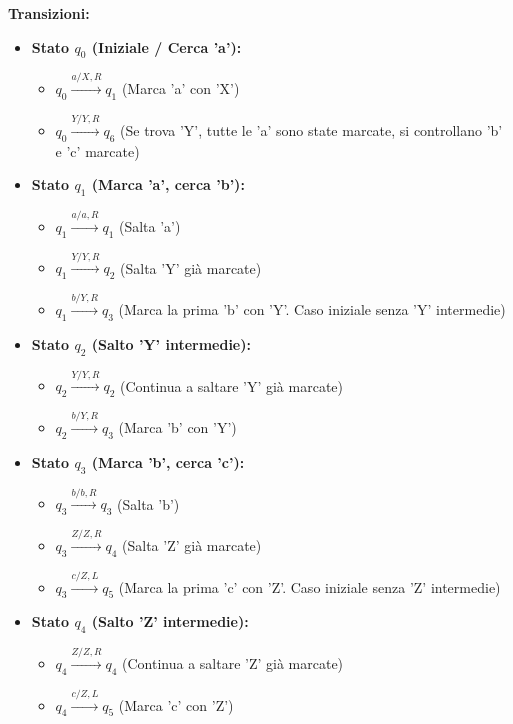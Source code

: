 \documentclass[a4paper]{article}
\begin{document}
\noindent \textbf{Transizioni:}
\begin{itemize}
    \item \textbf{Stato $q_0$ (Iniziale / Cerca 'a'):}
        \begin{itemize}
            \item $q_0 \xrightarrow{a / X, R} q_1$ (Marca 'a' con 'X')
            \item $q_0 \xrightarrow{Y / Y, R} q_6$ (Se trova 'Y', tutte le 'a' sono state marcate, si controllano 'b' e 'c' marcate)
        \end{itemize}
    \item \textbf{Stato $q_1$ (Marca 'a', cerca 'b'):}
        \begin{itemize}
            \item $q_1 \xrightarrow{a / a, R} q_1$ (Salta 'a')
            \item $q_1 \xrightarrow{Y / Y, R} q_2$ (Salta 'Y' già marcate)
            \item $q_1 \xrightarrow{b / Y, R} q_3$ (Marca la prima 'b' con 'Y'. Caso iniziale senza 'Y' intermedie)
        \end{itemize}
    \item \textbf{Stato $q_2$ (Salto 'Y' intermedie):}
        \begin{itemize}
            \item $q_2 \xrightarrow{Y / Y, R} q_2$ (Continua a saltare 'Y' già marcate)
            \item $q_2 \xrightarrow{b / Y, R} q_3$ (Marca 'b' con 'Y')
        \end{itemize}
    \item \textbf{Stato $q_3$ (Marca 'b', cerca 'c'):}
        \begin{itemize}
            \item $q_3 \xrightarrow{b / b, R} q_3$ (Salta 'b')
            \item $q_3 \xrightarrow{Z / Z, R} q_4$ (Salta 'Z' già marcate)
            \item $q_3 \xrightarrow{c / Z, L} q_5$ (Marca la prima 'c' con 'Z'. Caso iniziale senza 'Z' intermedie)
        \end{itemize}
    \item \textbf{Stato $q_4$ (Salto 'Z' intermedie):}
        \begin{itemize}
            \item $q_4 \xrightarrow{Z / Z, R} q_4$ (Continua a saltare 'Z' già marcate)
            \item $q_4 \xrightarrow{c / Z, L} q_5$ (Marca 'c' con 'Z')

\end{itemize}
\end{itemize}
\end{document}
